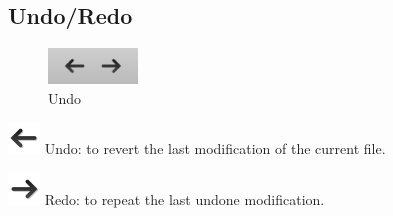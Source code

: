 \documentclass[a4paper,11pt]{report}
\begin{document}
\subsection{Undo/Redo}
\begin{minipage}[h]{4cm}
\begin{figure}[H]
\begin{center}
\includegraphics[scale=0.6]{./pictures/undoredotoolbar.png}
\caption{Undo}
\label{pic:undoredotoolbar}
\end{center}
\end{figure}
\end{minipage}
\begin{minipage}[h]{\textwidth-4cm}
\begin{trivlist}
	\item[] \includegraphics[scale = 0.5]{../../icons/undo.png} Undo: to revert the last modification of the current file.
	\item[] \includegraphics[scale = 0.5]{../../icons/redo.png} Redo: to repeat the last undone modification.
\end{trivlist}
\end{minipage}
\end{document}
